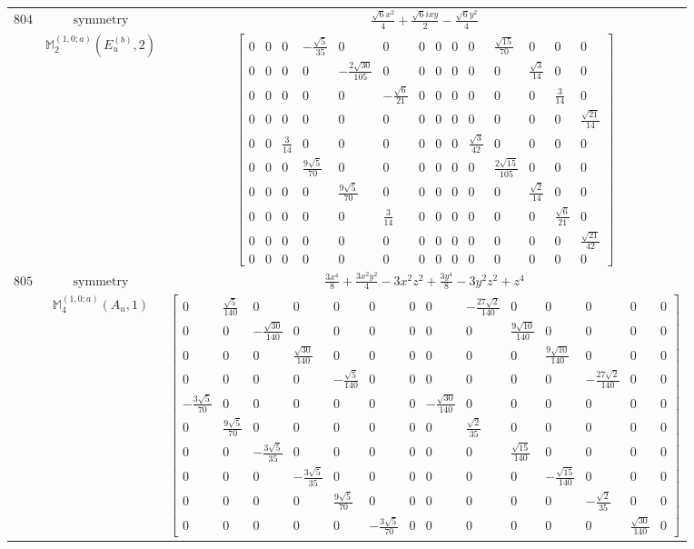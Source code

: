 \documentclass[fleqn,8pt,landscape]{jsarticle}
\begin{document}
\begin{longtable}{ccc}
$ 804 $ & $ \text{symmetry} $ & $ \frac{\sqrt{6} x^{2}}{4} + \frac{\sqrt{6} i x y}{2} - \frac{\sqrt{6} y^{2}}{4} $ \\
$  $ & $ \mathbb{M}_{2}^{(1,0;a)}(E_{u}^{(b)},2) $ & $ \begin{bmatrix} 0 & 0 & 0 & - \frac{\sqrt{5}}{35} & 0 & 0 & 0 & 0 & 0 & 0 & \frac{\sqrt{15}}{70} & 0 & 0 & 0 \\ 0 & 0 & 0 & 0 & - \frac{2 \sqrt{30}}{105} & 0 & 0 & 0 & 0 & 0 & 0 & \frac{\sqrt{3}}{14} & 0 & 0 \\ 0 & 0 & 0 & 0 & 0 & - \frac{\sqrt{6}}{21} & 0 & 0 & 0 & 0 & 0 & 0 & \frac{3}{14} & 0 \\ 0 & 0 & 0 & 0 & 0 & 0 & 0 & 0 & 0 & 0 & 0 & 0 & 0 & \frac{\sqrt{21}}{14} \\ 0 & 0 & \frac{3}{14} & 0 & 0 & 0 & 0 & 0 & 0 & \frac{\sqrt{3}}{42} & 0 & 0 & 0 & 0 \\ 0 & 0 & 0 & \frac{9 \sqrt{5}}{70} & 0 & 0 & 0 & 0 & 0 & 0 & \frac{2 \sqrt{15}}{105} & 0 & 0 & 0 \\ 0 & 0 & 0 & 0 & \frac{9 \sqrt{5}}{70} & 0 & 0 & 0 & 0 & 0 & 0 & \frac{\sqrt{2}}{14} & 0 & 0 \\ 0 & 0 & 0 & 0 & 0 & \frac{3}{14} & 0 & 0 & 0 & 0 & 0 & 0 & \frac{\sqrt{6}}{21} & 0 \\ 0 & 0 & 0 & 0 & 0 & 0 & 0 & 0 & 0 & 0 & 0 & 0 & 0 & \frac{\sqrt{21}}{42} \\ 0 & 0 & 0 & 0 & 0 & 0 & 0 & 0 & 0 & 0 & 0 & 0 & 0 & 0 \end{bmatrix} $ \\ \hline
$ 805 $ & $ \text{symmetry} $ & $ \frac{3 x^{4}}{8} + \frac{3 x^{2} y^{2}}{4} - 3 x^{2} z^{2} + \frac{3 y^{4}}{8} - 3 y^{2} z^{2} + z^{4} $ \\
$  $ & $ \mathbb{M}_{4}^{(1,0;a)}(A_{u},1) $ & $ \begin{bmatrix} 0 & \frac{\sqrt{5}}{140} & 0 & 0 & 0 & 0 & 0 & 0 & - \frac{27 \sqrt{2}}{140} & 0 & 0 & 0 & 0 & 0 \\ 0 & 0 & - \frac{\sqrt{30}}{140} & 0 & 0 & 0 & 0 & 0 & 0 & \frac{9 \sqrt{10}}{140} & 0 & 0 & 0 & 0 \\ 0 & 0 & 0 & \frac{\sqrt{30}}{140} & 0 & 0 & 0 & 0 & 0 & 0 & \frac{9 \sqrt{10}}{140} & 0 & 0 & 0 \\ 0 & 0 & 0 & 0 & - \frac{\sqrt{5}}{140} & 0 & 0 & 0 & 0 & 0 & 0 & - \frac{27 \sqrt{2}}{140} & 0 & 0 \\ - \frac{3 \sqrt{5}}{70} & 0 & 0 & 0 & 0 & 0 & 0 & - \frac{\sqrt{30}}{140} & 0 & 0 & 0 & 0 & 0 & 0 \\ 0 & \frac{9 \sqrt{5}}{70} & 0 & 0 & 0 & 0 & 0 & 0 & \frac{\sqrt{2}}{35} & 0 & 0 & 0 & 0 & 0 \\ 0 & 0 & - \frac{3 \sqrt{5}}{35} & 0 & 0 & 0 & 0 & 0 & 0 & \frac{\sqrt{15}}{140} & 0 & 0 & 0 & 0 \\ 0 & 0 & 0 & - \frac{3 \sqrt{5}}{35} & 0 & 0 & 0 & 0 & 0 & 0 & - \frac{\sqrt{15}}{140} & 0 & 0 & 0 \\ 0 & 0 & 0 & 0 & \frac{9 \sqrt{5}}{70} & 0 & 0 & 0 & 0 & 0 & 0 & - \frac{\sqrt{2}}{35} & 0 & 0 \\ 0 & 0 & 0 & 0 & 0 & - \frac{3 \sqrt{5}}{70} & 0 & 0 & 0 & 0 & 0 & 0 & \frac{\sqrt{30}}{140} & 0 \end{bmatrix} $ \\ \hline

\end{longtable}
\end{document}
